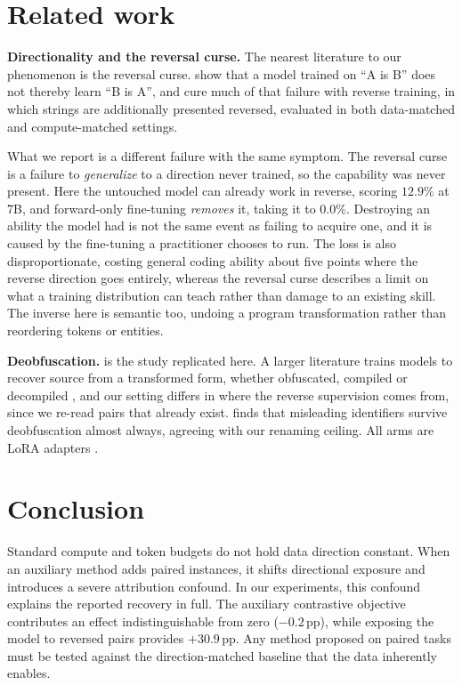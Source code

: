 \documentclass{article}
\begin{document}
\section{Related work}

\textbf{Directionality and the reversal curse.} The nearest literature to our phenomenon is
the reversal curse. \citet{berglund2024reversal} show that a model trained on ``A is B'' does
not thereby learn ``B is A'', and \citet{golovneva2024reverse} cure much of that failure with
reverse training, in which strings are additionally presented reversed, evaluated in both
data-matched and compute-matched settings. 

What we report is a different failure with the same symptom. The reversal curse is a failure to
\emph{generalize} to a direction never trained, so the capability was never present. Here the
untouched model can already work in reverse, scoring $12.9\%$ at 7B, and forward-only
fine-tuning \emph{removes} it, taking it to $0.0\%$. Destroying an ability the model had is not
the same event as failing to acquire one, and it is caused by the fine-tuning a practitioner
chooses to run. The loss is also disproportionate, costing general coding ability about five
points where the reverse direction goes entirely, whereas
the reversal curse describes a limit on what a training distribution can teach rather than
damage to an existing skill. The inverse here is semantic too, undoing a program
transformation rather than reordering tokens or entities.

\textbf{Deobfuscation.} \citet{nikiema2025contrastive} is the study replicated here. A larger
literature trains models to recover source from a transformed form, whether obfuscated,
compiled or decompiled \citep{roziere2021dobf,tan2024llm4decompile,hu2026bindeobf}, and our
setting differs in where the reverse supervision comes from, since we re-read pairs that
already exist. \citet{guzman2026poisoned} finds that misleading identifiers survive
deobfuscation almost always, agreeing with our renaming ceiling. All arms are LoRA adapters
\citep{hu2022lora}.

\section{Conclusion}
\label{sec:limits}
Standard compute and token budgets do not hold data direction constant. When an auxiliary method adds paired instances, it shifts directional exposure and introduces a severe attribution confound. In our experiments, this confound explains the reported recovery in full. The auxiliary contrastive objective contributes an effect indistinguishable from zero ($-0.2$\,pp), while exposing the model to reversed pairs provides $+30.9$\,pp. Any method proposed on paired tasks must be tested against the direction-matched baseline that the data inherently enables.
\end{document}

